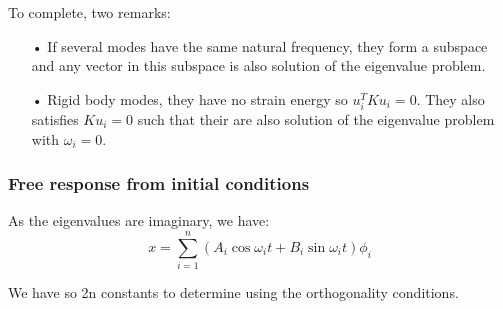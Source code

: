 				To complete, two remarks: 
				
				\begin{itemize}
				\item[•] If several modes have the same natural frequency, they form a subspace and any vector in this subspace is also solution of the eigenvalue problem.\\
				 \item[•] Rigid body modes, they have no strain energy so $u_i^T K u_i = 0$. They also satisfies $Ku_i = 0$ such that their are also solution of the eigenvalue problem with $\omega _i = 0$. 
				\end{itemize}
				
				\subsubsection{Free response from initial conditions}
					As the eigenvalues are imaginary, we have:
					\begin{equation}
					x = \sum _{i = 1} ^n (A_i\cos \omega _i t + B_i \sin \omega _i t) \phi _i
					\end{equation}
					
					We have so 2n constants to determine using the orthogonality conditions. 